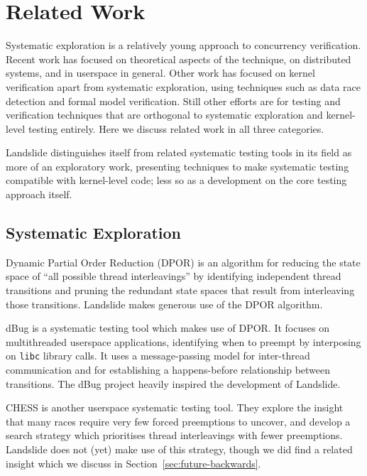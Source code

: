 \section{Related Work}

Systematic exploration is a relatively young approach to concurrency verification.
Recent work has focused on theoretical aspects of the technique, on distributed systems, and in userspace in general.
Other work has focused on kernel verification apart from systematic exploration, using techniques such as data race detection and formal model verification.
Still other efforts are for testing and verification techniques that are orthogonal to systematic exploration and kernel-level testing entirely.
Here we discuss related work in all three categories.

Landslide distinguishes itself from related systematic testing tools in its field as more of an exploratory work, presenting techniques to make systematic testing compatible with kernel-level code; less so as a development on the core testing approach itself.

\subsection{Systematic Exploration}

Dynamic Partial Order Reduction (DPOR) \cite{dpor,sdpor,dbug-retreat,distributed-dpor} is an algorithm for reducing the state space of ``all possible thread interleavings'' by identifying independent thread transitions and pruning the redundant state spaces that result from interleaving those transitions. Landslide makes generous use of the DPOR algorithm.

dBug\cite{dbug-ssv} is a systematic testing tool which makes use of DPOR. It focuses on multithreaded userspace applications, identifying when to preempt by interposing on \texttt{libc} library calls. It uses a message-passing model for inter-thread communication and for establishing a happens-before relationship between transitions. The dBug project heavily inspired the development of Landslide.

CHESS\cite{chess} is another userspace systematic testing tool. They explore the insight that many races require very few forced preemptions to uncover, and develop a search strategy which prioritises thread interleavings with fewer preemptions. Landslide does not (yet) make use of this strategy, though we did find a related insight which we discuss in Section~\ref{sec:future-backwards}.

